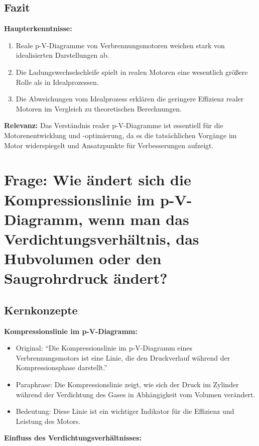\documentclass[a4paper,12pt]{article}
\begin{document}
\subsection{Fazit}

\textbf{Haupterkenntnisse:}

\begin{enumerate}
    \item Reale p-V-Diagramme von Verbrennungsmotoren weichen stark von idealisierten Darstellungen ab.
    \item Die Ladungswechselschleife spielt in realen Motoren eine wesentlich größere Rolle als in Idealprozessen.
    \item Die Abweichungen vom Idealprozess erklären die geringere Effizienz realer Motoren im Vergleich zu theoretischen Berechnungen.
\end{enumerate}

\textbf{Relevanz:} Das Verständnis realer p-V-Diagramme ist essentiell für die Motorenentwicklung und -optimierung, da es die tatsächlichen Vorgänge im Motor widerspiegelt und Ansatzpunkte für Verbesserungen aufzeigt.

\section{Frage: Wie ändert sich die Kompressionslinie im p-V-Diagramm, wenn man das Verdichtungsverhältnis, das Hubvolumen oder den Saugrohrdruck ändert?}

\subsection{Kernkonzepte}

\textbf{Kompressionslinie im p-V-Diagramm:}

\begin{itemize}
    \item Original: \enquote{Die Kompressionslinie im p-V-Diagramm eines Verbrennungsmotors ist eine Linie, die den Druckverlauf während der Kompressionsphase darstellt.}
    \item Paraphrase: Die Kompressionslinie zeigt, wie sich der Druck im Zylinder während der Verdichtung des Gases in Abhängigkeit vom Volumen verändert.
    \item Bedeutung: Diese Linie ist ein wichtiger Indikator für die Effizienz und Leistung des Motors.
\end{itemize}

\textbf{Einfluss des Verdichtungsverhältnisses:}
\end{document}
